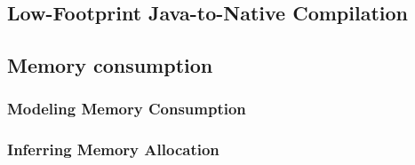 

\subsection{Low-Footprint Java-to-Native Compilation}

\subsection{Memory consumption}

\subsubsection{Modeling Memory Consumption}\label{sec:verif}

\subsubsection{Inferring Memory Allocation}\label{sec:infer}



